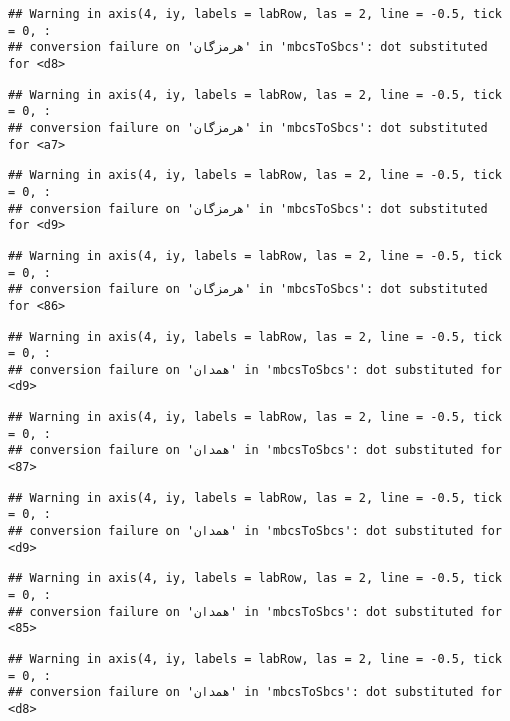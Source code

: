 \documentclass[
]{article}
\begin{document}
\begin{verbatim}
## Warning in axis(4, iy, labels = labRow, las = 2, line = -0.5, tick = 0, :
## conversion failure on 'هرمزگان' in 'mbcsToSbcs': dot substituted for <d8>
\end{verbatim}

\begin{verbatim}
## Warning in axis(4, iy, labels = labRow, las = 2, line = -0.5, tick = 0, :
## conversion failure on 'هرمزگان' in 'mbcsToSbcs': dot substituted for <a7>
\end{verbatim}

\begin{verbatim}
## Warning in axis(4, iy, labels = labRow, las = 2, line = -0.5, tick = 0, :
## conversion failure on 'هرمزگان' in 'mbcsToSbcs': dot substituted for <d9>
\end{verbatim}

\begin{verbatim}
## Warning in axis(4, iy, labels = labRow, las = 2, line = -0.5, tick = 0, :
## conversion failure on 'هرمزگان' in 'mbcsToSbcs': dot substituted for <86>
\end{verbatim}

\begin{verbatim}
## Warning in axis(4, iy, labels = labRow, las = 2, line = -0.5, tick = 0, :
## conversion failure on 'همدان' in 'mbcsToSbcs': dot substituted for <d9>
\end{verbatim}

\begin{verbatim}
## Warning in axis(4, iy, labels = labRow, las = 2, line = -0.5, tick = 0, :
## conversion failure on 'همدان' in 'mbcsToSbcs': dot substituted for <87>
\end{verbatim}

\begin{verbatim}
## Warning in axis(4, iy, labels = labRow, las = 2, line = -0.5, tick = 0, :
## conversion failure on 'همدان' in 'mbcsToSbcs': dot substituted for <d9>
\end{verbatim}

\begin{verbatim}
## Warning in axis(4, iy, labels = labRow, las = 2, line = -0.5, tick = 0, :
## conversion failure on 'همدان' in 'mbcsToSbcs': dot substituted for <85>
\end{verbatim}

\begin{verbatim}
## Warning in axis(4, iy, labels = labRow, las = 2, line = -0.5, tick = 0, :
## conversion failure on 'همدان' in 'mbcsToSbcs': dot substituted for <d8>
\end{verbatim}
\end{document}
